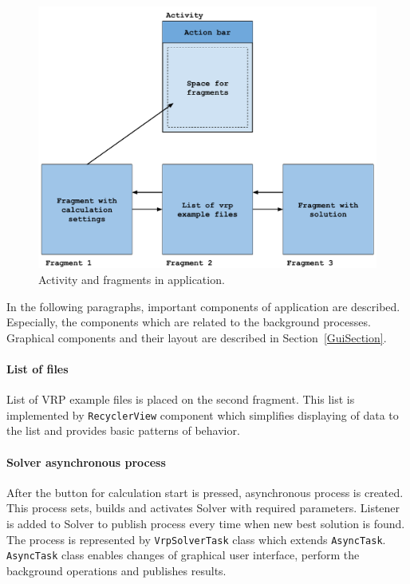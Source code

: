 \begin{figure}[h!]
    \centering
    \includegraphics[scale=0.7]{fig/act_frag.pdf}
    \caption{Activity and fragments in application.}
    \label{ActivityFragmentsFigure}
\end{figure}

In the following paragraphs, important components of application are described. Especially, the components which are
related to the background processes. Graphical components and their layout are described in Section~\ref{GuiSection}.

\paragraph{List of files}
List of VRP example files is placed on the second fragment. This list is implemented by \texttt{RecyclerView} component
which simplifies displaying of data to the list and provides basic patterns of behavior.

\paragraph{Solver asynchronous process}
After the button for calculation start is pressed, asynchronous process is created. This process sets, builds and
activates Solver with required parameters. Listener is added to Solver to publish process every time when new best
solution is found. The process is represented by \texttt{VrpSolverTask} class which extends \texttt{AsyncTask}.
\texttt{AsyncTask} class enables changes of graphical user interface, perform the background operations and publishes
results.


